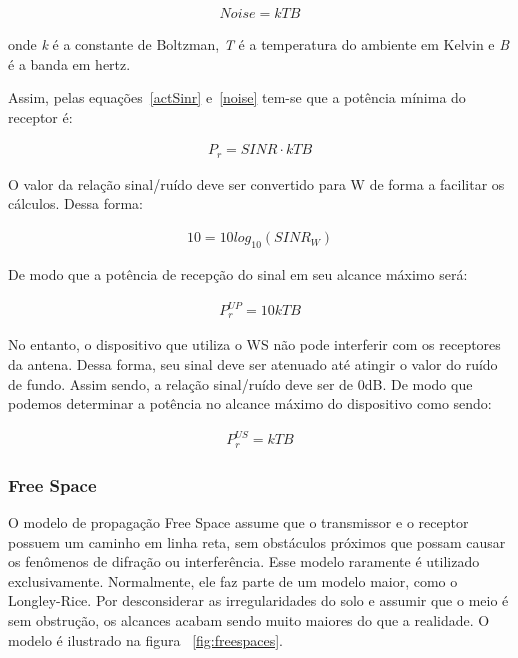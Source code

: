 \begin{align}
  \label{noise} Noise=kTB
\end{align}

onde \textit{k} é a constante de Boltzman, \textit{T} é a temperatura do ambiente em Kelvin e \textit{B} é a banda em hertz.

Assim, pelas equações~\ref{actSinr} e~\ref{noise} tem-se que a potência mínima do receptor é:

\begin{align}
  \label{minPot} P_r= SINR \cdot  kTB
\end{align}

O valor da relação sinal/ruído deve ser convertido para W de forma a facilitar os cálculos. Dessa forma:

\begin{align}
  \label{SinrW} 10= 10 log_{10} (SINR_W)
\end{align}

De modo que a potência de recepção do sinal em seu alcance máximo será:

\begin{align}
  \label{minPotAnt} P_{r}^{UP}= 10kTB
\end{align}

 No entanto, o dispositivo que utiliza o WS não pode interferir com os receptores da antena. Dessa forma, seu sinal deve ser atenuado até atingir o valor do ruído de fundo. Assim sendo, a relação sinal/ruído deve ser de 0dB. De modo que podemos determinar a potência no alcance máximo do dispositivo como sendo:

\begin{align}
  \label{minPotDev} P_{r}^{US}=  kTB
\end{align}

\subsubsection{Free Space}

O modelo de propagação Free Space assume que o transmissor e o receptor possuem um caminho em linha reta, sem obstáculos próximos que possam causar os fenômenos de difração ou interferência. Esse modelo raramente é utilizado exclusivamente. Normalmente, ele faz parte de um modelo maior, como o Longley-Rice. Por desconsiderar as irregularidades do solo e assumir que o meio é sem obstrução, os alcances acabam sendo muito maiores do que a realidade. O modelo é ilustrado na figura ~\ref{fig:freespaces}.

